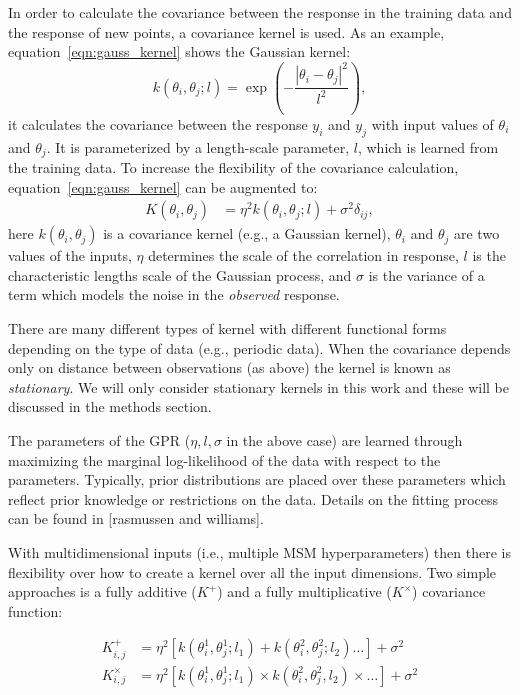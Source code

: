 \documentclass[journal=jacsat,manuscript=article]{achemso}
\begin{document}
In order to calculate the covariance between the response in the training data and the response of new points, a covariance kernel is used. As an example, equation~\ref{eqn:gauss_kernel} shows the Gaussian kernel: 
\begin{equation}
    k(\theta_i, \theta_j; l) =  \exp\left(-\frac{\left|\theta_i-\theta_j\right|^2}{l^2}\right), \label{eqn:gauss_kernel}
\end{equation}
it calculates the covariance between the response $y_i$ and $y_j$ with input values of $\theta_i$ and $\theta_j$. It is parameterized by a length-scale parameter, $l$, which is learned from the training data. To increase the flexibility of the covariance calculation, equation~\ref{eqn:gauss_kernel} can be augmented to: 
\begin{align}
    K(\theta_i, \theta_j) & = \eta^2  k(\theta_i, \theta_j; l) + \sigma^2\delta_{ij}, 
\end{align}
here $k(\theta_i, \theta_j)$ is a covariance kernel (e.g., a Gaussian kernel),  $\theta_i$ and $\theta_j$ are two values of the inputs, $\eta$ determines the scale of the correlation in response, $l$ is the characteristic lengths scale of the Gaussian process, and $\sigma$ is the variance of a term which models the noise in the \emph{observed} response. 

There are many different types of kernel with different functional forms depending on the type of data (e.g., periodic data). When the covariance depends only on distance between observations (as above) the kernel is known as \emph{stationary}.  We will only consider stationary kernels in this work and these will be discussed in the methods section. 

The parameters of the GPR ($\eta, l, \sigma$ in the above case) are learned through maximizing the marginal log-likelihood of the data with respect to the parameters. Typically, prior distributions are placed over these parameters which reflect prior knowledge or restrictions on the data. Details on the fitting process can be found in [rasmussen and williams]. 

With multidimensional inputs (i.e., multiple MSM hyperparameters) then there is flexibility over how to create a kernel over all the input dimensions. Two simple approaches is a fully additive ($K^{\mathrm{+}}$) and a fully multiplicative ($K^{\mathrm{\times}}$) covariance function: 

\begin{align}
    K^{\mathrm{+}}_{i,j} & = \eta^2  \left [k(\theta^{1}_i, \theta^{1}_j; l_{1}) + k(\theta^{2}_i, \theta^{2}_j; l_{2}) \ldots \right ] + \sigma^2  \label{eqn:plus_kernel} \\ 
    K^{\mathrm{\times}}_{i,j} & = \eta^2  \left [k(\theta^{1}_i, \theta^{1}_j; l_{1}) \times k(\theta^{2}_i, \theta^{2}_j, l_{2}) \times \ldots \right ] + \sigma^2 \label{eqn:mult_kernel}
\end{align}
\end{document}

